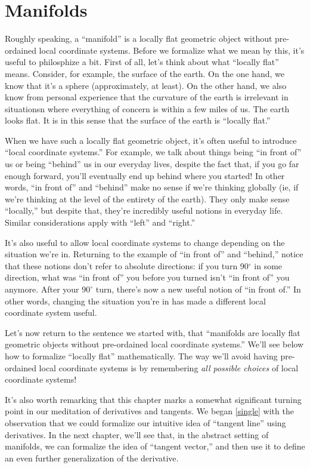\chapter{Manifolds}

Roughly speaking, a ``manifold'' is a locally flat geometric object without pre-ordained local coordinate systems. Before we formalize what we mean by this, it's useful to philosphize a bit. First of all, let's think about what ``locally flat'' means. Consider, for example, the surface of the earth. On the one hand, we know that it's a sphere (approximately, at least). On the other hand, we also know from personal experience that the curvature of the earth is irrelevant in situationsn where everything of concern is within a few miles of us. The earth looks flat. It is in this sense that the surface of the earth is ``locally flat.'' 

When we have such a locally flat geometric object, it's often useful to introduce ``local coordinate systems.'' For example, we talk about things being ``in front of'' us or being ``behind'' us in our everyday lives, despite the fact that, if you go far enough forward, you'll eventually end up behind where you started! In other words, ``in front of'' and ``behind'' make no sense if we're thinking globally (ie, if we're thinking at the level of the entirety of the earth). They only make sense ``locally,'' but despite that, they're incredibly useful notions in everyday life. Similar considerations apply with ``left'' and ``right.''

It's also useful to allow local coordinate systems to change depending on the situation we're in. Returning to the example of ``in front of'' and ``behind,'' notice that these notions don't refer to absolute directions: if you turn 90$^\circ$ in some direction, what was ``in front of'' you before you turned isn't ``in front of'' you anymore. After your $90^\circ$ turn, there's now a new useful notion of ``in front of.'' In other words, changing the situation you're in has made a different local coordinate system useful.

Let's now return to the sentence we started with, that ``manifolds are locally flat geometric objects without pre-ordained local coordinate systems.'' We'll see below how to formalize ``locally flat'' mathematically. The way we'll avoid having pre-ordained local coordinate systems is by remembering \emph{all possible choices} of local coordinate systems! 

It's also worth remarking that this chapter marks a somewhat significant turning point in our meditation of derivatives and tangents. We began \cref{single} with the observation that we could formalize our intuitive idea of ``tangent line'' using  derivatives. In the next chapter, we'll see that, in the abstract setting of manifolds, we can formalize the idea of ``tangent vector,'' and then use it to define an even further generalization of the derivative. 

